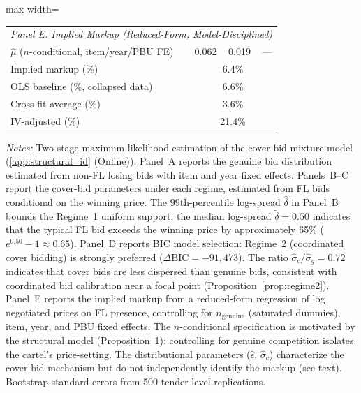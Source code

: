 \begin{table}[htbp]
\begin{adjustbox}{max width=\textwidth}
\begin{threeparttable}
\begin{tabular}{lccc}
\midrule
\multicolumn{4}{l}{\textit{Panel E: Implied Markup (Reduced-Form, Model-Disciplined)}} \\[3pt]
$\hat{\mu}$ ($n$-conditional, item/year/PBU FE) & 0.062 & 0.019 & --- \\
Implied markup (\%) & \multicolumn{3}{c}{6.4\%} \\
OLS baseline (\%, collapsed data) & \multicolumn{3}{c}{6.6\%} \\
Cross-fit average (\%) & \multicolumn{3}{c}{3.6\%} \\
IV-adjusted (\%) & \multicolumn{3}{c}{21.4\%} \\
\bottomrule
\end{tabular}
\begin{tablenotes}
\small
\item \textit{Notes:} Two-stage maximum likelihood estimation of the cover-bid
mixture model (\ref{app:structural_id} (Online)). Panel~A reports the
genuine bid distribution estimated from non-FL losing bids with item and year
fixed effects. Panels~B--C report the cover-bid parameters under each regime,
estimated from FL bids conditional on the winning price. The 99th-percentile
log-spread $\hat{\delta}$ in Panel~B bounds the Regime~1 uniform support;
the median log-spread $\tilde{\delta} = 0.50$ indicates that the typical FL
bid exceeds the winning price by approximately 65\%
($e^{0.50} - 1 \approx 0.65$). Panel~D reports BIC model selection: Regime~2
(coordinated cover bidding) is strongly preferred ($\Delta\text{BIC} =
-91{,}473$). The ratio $\hat{\sigma}_c / \hat{\sigma}_g = 0.72$ indicates
that cover bids are less dispersed than genuine bids, consistent with
coordinated bid calibration near a focal point (Proposition~\ref{prop:regime2}).
Panel~E reports the implied markup from a reduced-form regression
of log negotiated prices on FL presence, controlling for
$n_{\text{genuine}}$ (saturated dummies), item, year, and PBU fixed
effects. The $n$-conditional specification is motivated by the
structural model (Proposition~1): controlling for genuine competition
isolates the cartel's price-setting. The distributional parameters
($\hat{\epsilon}$, $\hat{\sigma}_c$) characterize the cover-bid
mechanism but do not independently identify the markup (see text).
Bootstrap standard errors from 500 tender-level replications.
\end{tablenotes}
\end{threeparttable}
\end{adjustbox}
\end{table}
